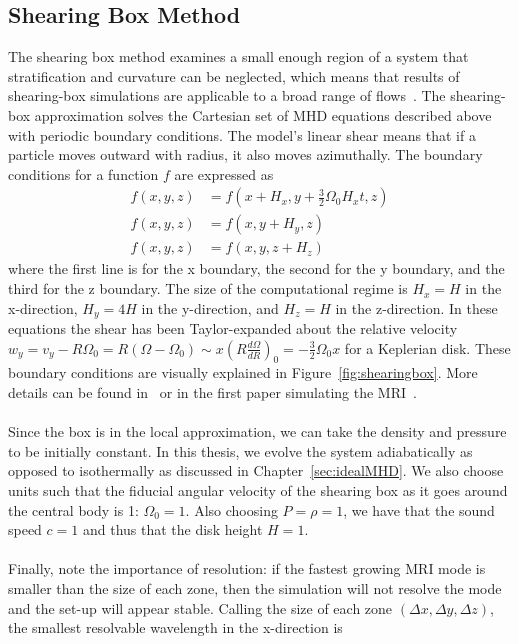 \subsection{Shearing Box Method}\label{ssec:shearingbox}
The shearing box method examines a small enough region of a system that stratification and curvature can be neglected, which means that results of shearing-box simulations are applicable to a broad range of flows~\cite{Walker2017}. The shearing-box approximation solves the Cartesian set of MHD equations described above with periodic boundary conditions. The model's linear shear means that if a particle moves outward with radius, it also moves azimuthally. The boundary conditions for a function $f$ are expressed as
\begin{align}
  f(x,y,z)&=f(x+H_x,y+\frac32\Omega_0H_xt,z)\label{eq:bcx}\\
  f(x,y,z)&=f(x,y+H_y,z)\label{eq:bcy}\\
  f(x,y,z)&=f(x,y,z+H_z)\label{eq:bcz}
\end{align}
where the first line is for the x boundary, the second for the y boundary, and the third for the z boundary. The size of the computational regime is $H_x=H$ in the x-direction, $H_y=4H$ in the y-direction, and $H_z=H$ in the z-direction. In these equations the shear has been Taylor-expanded about the relative velocity $w_y=v_y-R\Omega_0=R(\Omega-\Omega_0)\sim x\left(R\frac{d\Omega}{dR}\right)_0=-\frac32\Omega_0x$ for a Keplerian disk. These boundary conditions are visually explained in Figure~\ref{fig:shearingbox}. More details can be found in~ or in the first paper simulating the MRI~\cite{BH1991c}. \\
\\
Since the box is in the local approximation, we can take the density and pressure to be initially constant. In this thesis, we evolve the system adiabatically as opposed to isothermally as discussed in Chapter~\ref{sec:idealMHD}. We also choose units such that the fiducial angular velocity of the shearing box as it goes around the central body is 1: $\Omega_0=1$. Also choosing $P=\rho=1$, we have that the sound speed $c=1$ and thus that the disk height $H=1$. \\
\\
Finally, note the importance of resolution: if the fastest growing MRI mode is smaller than the size of each zone, then the simulation will not resolve the mode and the set-up will appear stable. Calling the size of each zone $(\Delta x,\Delta y,\Delta z)$, the smallest resolvable wavelength in the x-direction is
